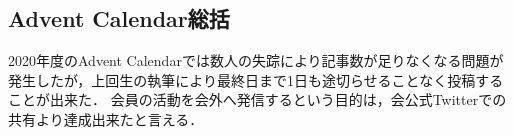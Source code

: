 \subsection*{Advent Calendar総括}



2020年度のAdvent Calendarでは\firstGrade{}数人の失踪により記事数が足りなくなる問題が発生したが，上回生の執筆により最終日まで1日も途切らせることなく投稿することが出来た．
会員の活動を会外へ発信するという目的は，会公式Twitterでの共有より達成出来たと言える．
